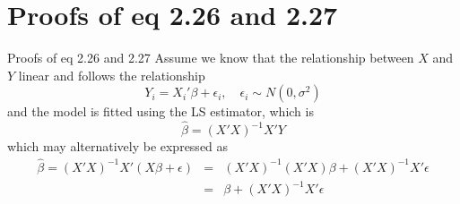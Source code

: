 \documentclass{beamer}
\begin{document}
\section{Proofs of eq 2.26 and 2.27}
\begin{frame}{Proofs of eq 2.26 and 2.27}
Assume we know that the relationship between $X$ and $Y$ linear and follows the relationship
\begin{equation}\label{eq: model}
Y_i=X_i'\beta+\epsilon_i,\quad \epsilon_i\sim N(0,\sigma^2)
\end{equation}
and the model is fitted using the LS estimator, which is
\[
\hat{\beta}=(X'X)^{-1}X'Y
\]
which may alternatively be expressed as
\begin{eqnarray*}
\hat{\beta}=(X'X)^{-1}X'(X\beta+\epsilon)&=&(X'X)^{-1}(X'X)\beta+(X'X)^{-1}X'\epsilon\\
&=&\beta+(X'X)^{-1}X'\epsilon
\end{eqnarray*}
\end{frame}
\end{document}

